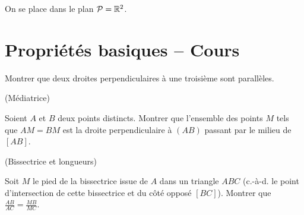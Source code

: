\documentclass[a4paper,11pt,reqno]{amsart}
\begin{document}

\begin{convention}
  On se place dans le plan $\mathcal{P}=\mathbb{R}^2$.
\end{convention}

\section{Propriétés basiques -- Cours}


\begin{exo}

  Montrer que deux droites perpendiculaires à une troisième sont parallèles.
\end{exo}

\begin{exo} (Médiatrice)

  Soient $A$ et $B$ deux points distincts. Montrer que l'ensemble des points $M$ tels que $AM=BM$ est la droite perpendiculaire à $(AB)$ passant par le milieu de $[AB]$.
\end{exo}

\begin{exo} (Bissectrice et longueurs)

  Soit $M$ le pied de la bissectrice issue de $A$ dans un triangle $ABC$ (c.-à-d. le point d'intersection de cette bissectrice et du côté opposé $[BC]$). Montrer que $\displaystyle{\frac{AB}{AC}=\frac{MB}{MC}}$.
\end{exo}
\end{document}
